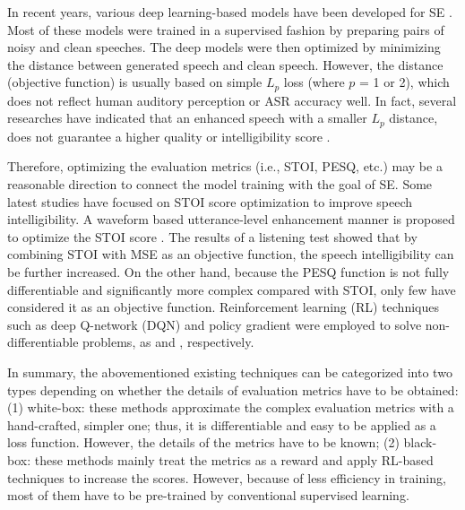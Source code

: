 \documentclass{article}
\begin{document}
In recent years, various deep learning-based models have been developed for SE \cite{lu2013speech,xu2014experimental,wang2014training,xu2015regression, ochiai2017multichannel,luo2018tasnet,grais2018raw,germain2018speech,chai2018error, choi2018phase}. Most of these models were trained in a supervised fashion by preparing pairs of noisy and clean speeches. The deep models were then optimized by minimizing the distance between generated speech and clean speech. However, the distance (objective function) is usually based on simple $L_{p}$ loss (where $p$ = 1 or 2), which does not reflect human auditory perception or ASR  accuracy  \cite{bagchi2018spectral} well. In fact, several researches have indicated that an enhanced speech with a smaller $L_{p}$ distance, does not guarantee a higher quality or intelligibility score \cite{fu2018end,koizumi2018dnn}.



Therefore, optimizing the evaluation metrics (i.e., STOI, PESQ, etc.) may be a reasonable direction to connect the model training with the goal of SE. Some latest studies \cite{fu2018end,koizumi2018dnn,zhang2018training,zhao2018perceptually,naithani2018deep, kolbaek2018monaural, venkataramani2018performance,venkataramani2018end,zhao2018convolutional} have focused on STOI score optimization to improve speech intelligibility. A waveform based utterance-level enhancement manner is proposed to optimize the STOI score \cite{fu2018end}. The results of a listening test showed that by combining STOI with MSE as an objective function, the speech intelligibility can be further increased. On the other hand, because the PESQ function is not fully differentiable and significantly more complex compared with STOI, only few \cite{koizumi2018dnn,zhang2018training,koizumi2017dnn, martin2018deep} have considered it as an objective function. Reinforcement learning (RL) techniques such as deep Q-network (DQN) and policy gradient were employed to solve non-differentiable  problems, as \cite{koizumi2017dnn} and \cite{koizumi2018dnn}, respectively. 



In summary, the abovementioned existing techniques can be categorized into two types depending on whether the details of evaluation metrics have to be obtained: (1) white-box: these methods approximate the complex evaluation metrics with a hand-crafted, simpler one; thus, it is differentiable and easy to be applied as a loss function. However, the details of the metrics have to be known; (2) black-box: these methods mainly treat the metrics as a reward and apply RL-based techniques to increase the scores. However, because of less efficiency in training, most of them have to be pre-trained by conventional supervised learning.
 
\end{document}
